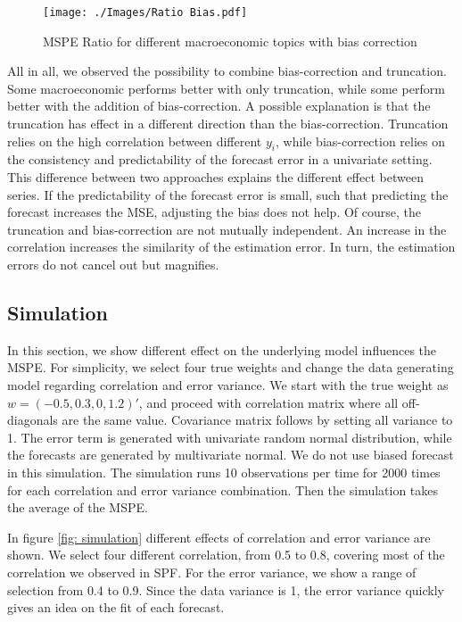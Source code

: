 \documentclass[11pt]{article}
\begin{document}
\begin{figure}[!h]
	\centering
	\texttt{[image: ./Images/Ratio Bias.pdf]}
	\caption{MSPE Ratio for different macroeconomic topics with bias correction}\label{fig: Ratio bias}
\end{figure}


All in all, we observed the possibility to combine bias-correction and truncation. Some macroeconomic performs better with only truncation, while some perform better with the addition of bias-correction. A possible explanation is that the truncation has effect in a different direction than the bias-correction. Truncation relies on the high correlation between different $y_i$, while bias-correction relies on the consistency and predictability of the forecast error in a univariate setting. This difference between two approaches explains the different effect between series. If the predictability of the forecast error is small, such that predicting the forecast increases the MSE, adjusting the bias does not help. Of course, the truncation and bias-correction are not mutually independent. An increase in the correlation increases the similarity of the estimation error. In turn, the estimation errors do not cancel out but magnifies. 



\subsection{Simulation}\label{simulation}
In this section, we show different effect on the underlying model influences the MSPE. For simplicity, we select four true weights and change the data generating model regarding correlation and error variance. We start with the true weight as $w=(-0.5,0.3,0,1.2)'$, and proceed with correlation matrix where all off-diagonals are the same value. Covariance matrix follows by setting all variance to 1. The error term is generated with univariate random normal distribution, while the forecasts are generated by multivariate normal. We do not use biased forecast in this simulation. The simulation runs 10 observations per time for 2000 times for each correlation and error variance combination. Then the simulation takes the average of the MSPE.

In figure \ref{fig: simulation} different effects of correlation and error variance are shown. We select four different correlation, from 0.5 to 0.8, covering most of the correlation we observed in SPF. For the error variance, we show a range of selection from 0.4 to 0.9. Since the data variance is 1, the error variance quickly gives an idea on the fit of each forecast. 
\end{document}
